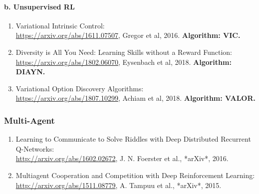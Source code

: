 \documentclass[lang=cn,11pt,a4paper]{elegant_template}
\begin{document}
\paragraph{b. Unsupervised RL}
\begin{enumerate}
    \item Variational Intrinsic Control:\\ \href{https://arxiv.org/abs/1611.07507}{https://arxiv.org/abs/1611.07507}, Gregor et al, 2016. \textbf{Algorithm: VIC.}
    \item Diversity is All You Need: Learning Skills without a Reward Function:\\ \href{https://arxiv.org/abs/1802.06070}{https://arxiv.org/abs/1802.06070}, Eysenbach et al, 2018. \textbf{Algorithm: DIAYN.}
    \item Variational Option Discovery Algorithms:\\ \href{https://arxiv.org/abs/1807.10299}{https://arxiv.org/abs/1807.10299}, Achiam et al, 2018. \textbf{Algorithm: VALOR.}
\end{enumerate}

\subsubsection{Multi-Agent}
\begin{enumerate}
    \item Learning to Communicate to Solve Riddles with Deep Distributed Recurrent Q-Networks:\\ \href{http://arxiv.org/abs/1602.02672}{http://arxiv.org/abs/1602.02672}, J. N. Foerster et al., *arXiv*, 2016.
    \item Multiagent Cooperation and Competition with Deep Reinforcement Learning:\\ \href{http://arxiv.org/abs/1511.08779}{http://arxiv.org/abs/1511.08779}, A. Tampuu et al., *arXiv*, 2015.
\end{enumerate}
\end{document}
